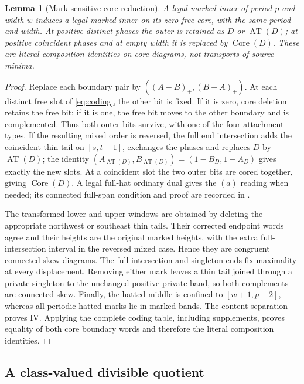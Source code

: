 \documentclass[11pt,a4paper]{amsart}
\numberwithin{equation}{section}
\theoremstyle{plain}
\newtheorem{lemma}[theorem]{Lemma}
\theoremstyle{definition}
\newcommand{\AT}{\operatorname{AT}}
\newcommand{\Core}{\operatorname{Core}}
\begin{document}
\begin{lemma}[Mark-sensitive core reduction]\label{lem:marked-core}
A legal marked inner of period \(p\) and width \(w\) induces a legal marked inner
on its zero-free core, with the same period and width.  At positive distinct
phases the outer is retained as \(D\) or \(\AT(D)\); at positive coincident phases
and at empty width it is replaced by \(\Core(D)\).  These are literal
composition identities on core diagrams, not transports of source minima.
\end{lemma}
\begin{proof}
Replace each boundary pair by
\(((A-B)_+,(B-A)_+)\).  At each distinct free slot of \eqref{eq:coding}, the
other bit is fixed.  If it is zero, core deletion retains the free bit; if
it is one, the free bit moves to the other boundary and is complemented.
Thus both outer bits survive, with one of the four attachment types.
If the resulting mixed order is reversed, the full end intersection adds
the coincident thin tail on \([s,t-1]\), exchanges the phases and replaces
\(D\) by \(\AT(D)\); the identity
\((A_{\AT(D)},B_{\AT(D)})=(1-B_D,1-A_D)\) gives exactly the new slots.
At a coincident slot the two outer bits are cored together, giving
\(\Core(D)\).  A legal full-hat ordinary dual gives the \((a)\) reading when
needed; its connected full-span condition and proof are recorded in
.

The transformed lower and upper windows are obtained by deleting the
appropriate northwest or southeast thin tails.  Their corrected endpoint
words agree and their heights are the original marked heights, with the
extra full-intersection interval in the reversed mixed case.  Hence they are
congruent connected skew diagrams.  The full intersection and singleton ends
fix maximality at every displacement.  Removing either mark leaves a thin
tail joined through a private singleton to the unchanged positive private
band, so both complements are connected skew.  Finally, the hatted middle
is confined to \([w+1,p-2]\), whereas all periodic hatted marks lie in marked
bands.  The content separation proves IV.  Applying the complete coding table,
including supplements, proves equality of both core boundary words and
therefore the literal composition identities.
\end{proof}

\subsection{A class-valued divisible quotient}
\end{document}
